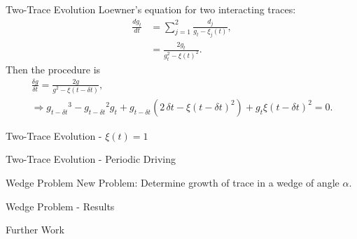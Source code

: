 \documentclass{beamer}
\begin{document}
\begin{frame}{Two-Trace Evolution}
    Loewner's equation for two interacting traces:
    \begin{align*}
        \frac{dg_t}{dt} &= \sum_{j=1}^2 \frac{d_j}{g_t - \xi_j (t)}, \\
        &= \frac{2g_t}{g_t^2 - \xi(t)^2}.
    \end{align*}
    Then the procedure is
    \begin{gather*}
        \frac{\delta g}{\delta t} =  \frac{2g}{g^2 - \xi(t - \delta t)}, \\
     \Rightarrow {g_{t - \delta t}}^{3} - {g_{t - \delta t}}^{2} {g_t} + {g_{t -\delta t}} (2 \, {\delta t} - {\xi(t - \delta t)}^{2} ) + {g_t} {\xi(t - \delta t)}^{2} = 0.
    \end{gather*}
\end{frame}

\begin{frame}{Two-Trace Evolution - $\xi(t) = 1$}
\begin{adjustbox}{max totalsize={\textwidth}{\textheight}}

\end{adjustbox}
\end{frame}

\begin{frame}{Two-Trace Evolution - Periodic Driving}
\begin{adjustbox}{max totalsize={\textwidth}{0.85\textheight}, center}

\end{adjustbox}
\end{frame}

\begin{frame}{Wedge Problem}
    New Problem: Determine growth of trace in a wedge of angle $\alpha$.\\[10pt]
\begin{adjustbox}{max totalsize={\textwidth}{\textheight}, center}

\end{adjustbox}
\end{frame}

\begin{frame}{Wedge Problem - Results}
\begin{adjustbox}{max totalsize={\textwidth}{\textheight}}

\end{adjustbox}
\end{frame}

\begin{frame}{Further Work}
\end{frame}
\end{document}
